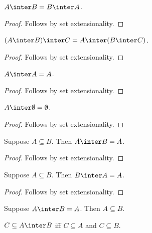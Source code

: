 \begin{proposition}%
\label{inter_comm}
    $A\inter B = B\inter A$.
\end{proposition}
\begin{proof}
    Follows by set extensionality.
\end{proof}

\begin{proposition}%
\label{inter_assoc}
    $(A\inter B)\inter C = A\inter (B\inter C)$.
\end{proposition}
\begin{proof}
    Follows by set extensionality.
\end{proof}

\begin{proposition}%
\label{inter_idempotent}
    $A\inter A = A$.
\end{proposition}
\begin{proof}
    Follows by set extensionality.
\end{proof}

\begin{proposition}\label{inter_emptyset}
    $A\inter\emptyset = \emptyset$.
\end{proposition}
\begin{proof}
    Follows by set extensionality.
\end{proof}

\begin{proposition}%
\label{inter_absorb_supseteq_right}
    Suppose $A\subseteq B$. Then $A\inter B = A$.
\end{proposition}
\begin{proof}
    Follows by set extensionality.
\end{proof}

\begin{proposition}%
\label{inter_absorb_supseteq_left}
    Suppose $A\subseteq B$. Then $B\inter A = A$.
\end{proposition}
\begin{proof}
    Follows by set extensionality.
\end{proof}

\begin{proposition}%
\label{inter_eq_left_implies_subseteq}
    Suppose $A\inter B = A$. Then $A\subseteq B$.
\end{proposition}

\begin{proposition}\label{subseteq_inter_iff}
    $C\subseteq A\inter B$ iff $C\subseteq A$ and $C\subseteq B$.
\end{proposition}

